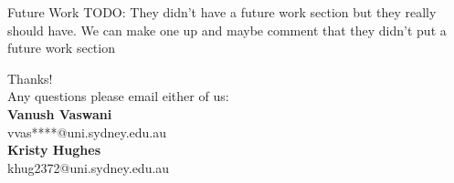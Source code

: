\documentclass{lecture}
\begin{document}
\begin{plain}{Future Work}
TODO: They didn't have a future work section but they really should have. We can make one up and maybe comment that they didn't put a future work section
\end{plain}

\begin{plain}{}
\begin{center}
\Huge
Thanks!\\
\vspace{3ex}
\Large
Any questions please email either of us:\\
\vspace{2ex}
\large
\textbf{Vanush Vaswani}\\
\normalsize
vvas****@uni.sydney.edu.au\\
\vspace{1ex}
\large
\textbf{Kristy Hughes}\\
\normalsize
khug2372@uni.sydney.edu.au
\end{center}
\end{plain}
\end{document}
